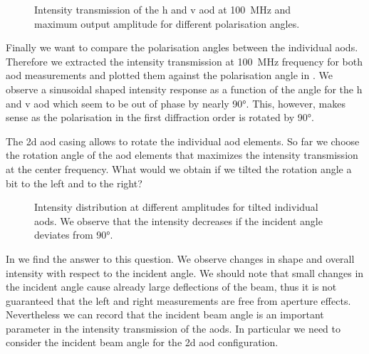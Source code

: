 \begin{figure}[htb]
  \centering
  \begin{adjustbox}{width=\textwidth}
  \end{adjustbox}
  \caption{Intensity transmission of the \gls{h} and \gls{v} \gls{aod} at
    \SI{100}{\mega\hertz} and maximum output amplitude for different
    polarisation angles.
  }\label{fig:intensity_polarisation}
\end{figure}
Finally we want to compare the polarisation angles between the individual
\gls{aod}s. Therefore we extracted the intensity transmission at
\SI{100}{\mega\hertz} frequency for both \gls{aod} measurements and plotted
them against the polarisation angle in . We
observe a sinusoidal shaped intensity response as a function of the angle
for the \gls{h} and \gls{v} \gls{aod} which seem to be out of phase by nearly
\ang{90}. This, however, makes sense as the polarisation in the first
diffraction order is rotated by \ang{90}.

The \gls{2d} \gls{aod} casing allows to rotate the individual \gls{aod}
elements. So far we choose the rotation angle of the \gls{aod} elements that
maximizes the intensity transmission at the center frequency. What would we
obtain if we tilted the rotation angle a bit to the left and to the right?
\begin{figure}[htb]
  \centering
  \begin{adjustbox}{width=\textwidth}
  \end{adjustbox}
  \caption{Intensity distribution at different amplitudes for tilted
    individual \gls{aod}s. We observe that the intensity decreases if the
    incident angle deviates from \ang{90}.
  }\label{fig:intensity_distribution_tilted}
\end{figure}
In  we find the answer to this
question. We observe changes in shape and overall intensity with respect
to the incident angle. We should note that small changes in the incident
angle cause already large deflections of the beam, thus it is not guaranteed
that the left and right measurements are free from aperture effects.
Nevertheless we can record that the incident beam angle is an important
parameter in the intensity transmission of the \gls{aod}s. In particular we
need to consider the incident beam angle for the \gls{2d} \gls{aod}
configuration.

